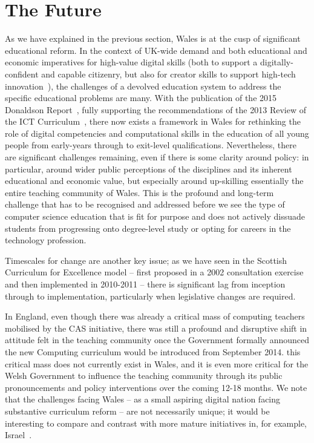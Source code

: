 \documentclass{sig-alternate}
\begin{document}
\section{The Future}\label{conclusions}

As we have explained in the previous section, Wales is at the cusp of
significant educational reform. In the context of UK-wide demand and
both educational and economic imperatives for high-value digital
skills (both to support a digitally-confident and capable citizenry,
but also for creator skills to support high-tech
innovation~\cite{ukdigskillstf:2014,ukholdigskills:2015}), the
challenges of a devolved education system to address the specific
educational problems are many. With the publication of the 2015
Donaldson Report~\cite{Donaldson:2015}, fully supporting the
recommendations of the 2013 Review of the ICT
Curriculum~\cite{welshictreview:2013}, there now exists a framework in
Wales for rethinking the role of digital competencies and
computational skills in the education of all young people from
early-years through to exit-level qualifications. Nevertheless, there
are significant challenges remaining, even if there is some clarity
around policy: in particular, around wider public perceptions of the
disciplines and its inherent educational and economic value, but
especially around up-skilling essentially the entire teaching
community of Wales. This is the profound and long-term challenge that
has to be recognised and addressed before we see the type of computer
science education that is fit for purpose and does not actively
dissuade students from progressing onto degree-level study or opting
for careers in the technology profession.

Timescales for change are another key issue; as we have seen in the
Scottish Curriculum for Excellence model -- first proposed in a 2002
consultation exercise and then implemented in 2010-2011 -- there is
significant lag from inception through to implementation, particularly
when legislative changes are required.

In England, even though there was already a critical mass of computing
teachers mobilised by the CAS initiative, there was still a profound
and disruptive shift in attitude felt in the teaching community once
the Government formally announced the new Computing curriculum would
be introduced from September 2014.  this critical mass does not
currently exist in Wales, and it is even more critical for the Welsh
Government to influence the teaching community through its public
pronouncements and policy interventions over the coming 12-18
months. We note that the challenges facing Wales -- as a small
aspiring digital nation facing substantive curriculum reform -- are
not necessarily unique; it would be interesting to compare and
contrast with more mature initiatives in, for example,
Israel~\cite{armonia+gal-ezerb:2014}.
\end{document}
